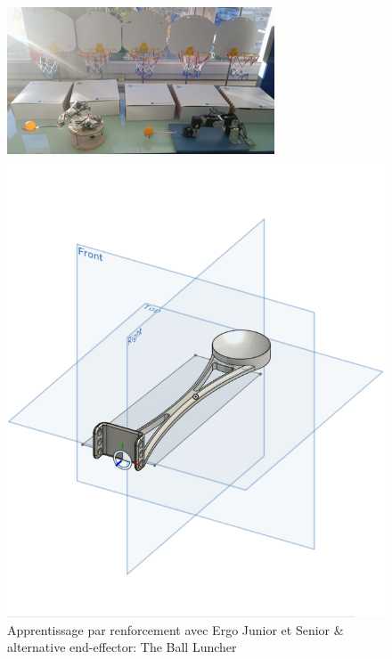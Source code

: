             \begin{figure}[!h]
            \begin{minipage}{0.7\linewidth}
                \centering
                \includegraphics[width=.9\linewidth]{Figures/YB-ErgoJr-ErgoSr.png}
                \subcaption{\label{fig:YB-ErgoJr-ErgoSr}}
            \end{minipage}
            \hfill
            \begin{minipage}{0.29\linewidth}
                \centering
                \includegraphics[width=\linewidth]{Figures/TS-ball-luncher.png}
                \subcaption{\label{fig:ball-luncher}}
            \end{minipage}
            \caption[Apprentissage par renforcement avec Ergo Senior]{Apprentissage par renforcement avec Ergo Junior et Senior \& alternative end-effector: The Ball Luncher~}\label{fig:ErgoJr-ErgoSr-luncher}
            \end{figure}\par%
